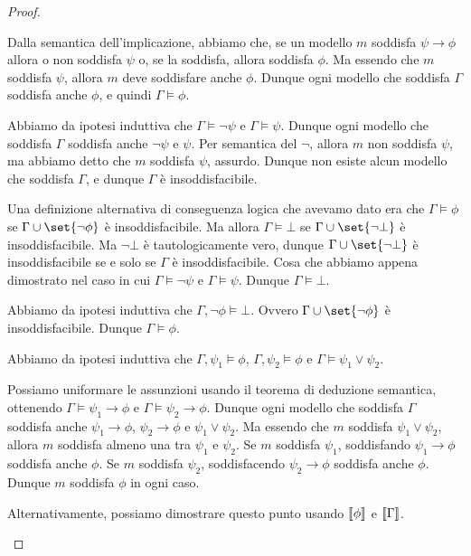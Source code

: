 \begin{proof}
\begin{description}
      Dalla semantica dell'implicazione, abbiamo che, se un modello \(m\) soddisfa \(\psi\to\phi\) allora o non soddisfa \(\psi\) o, se la soddisfa, allora soddisfa \(\phi\). Ma essendo che \(m\) soddisfa \(\psi\), allora \(m\) deve soddisfare anche \(\phi\). Dunque ogni modello che soddisfa \(\Gamma\) soddisfa anche \(\phi\), e quindi \(\Gamma\models\phi\).
    \item[\(\neg E\).] Abbiamo da ipotesi induttiva che \(\Gamma\models\neg\psi\) e \(\Gamma\models\psi\). Dunque ogni modello che soddisfa \(\Gamma\) soddisfa anche \(\neg\psi\) e \(\psi\). Per semantica del \(\neg\), allora \(m\) non soddisfa \(\psi\), ma abbiamo detto che \(m\) soddisfa \(\psi\), assurdo. Dunque non esiste alcun modello che soddisfa \(\Gamma\), e dunque \(\Gamma\) è insoddisfacibile.

    Una definizione alternativa di conseguenza logica che avevamo dato era che \(\Gamma\models\phi\) se \(\Gamma\cup\set{\neg\phi}\) è insoddisfacibile. Ma allora \(\Gamma\models\bot\) se \(\Gamma\cup\set{\neg \bot}\) è insoddisfacibile. Ma \(\neg\bot\) è tautologicamente vero, dunque \(\Gamma\cup\set{\neg \bot}\) è insoddisfacibile se e solo se \(\Gamma\) è insoddisfacibile. Cosa che abbiamo appena dimostrato nel caso in cui \(\Gamma\models\neg\psi\) e \(\Gamma\models\psi\). Dunque \(\Gamma\models\bot\).

    \item[\(\RAA\).] Abbiamo da ipotesi induttiva che \(\Gamma,\neg\phi\models\bot\). Ovvero \(\Gamma\cup\set{\neg\phi}\) è insoddisfacibile. Dunque \(\Gamma\models\phi\).
    \item[\(\lor E\).] Abbiamo da ipotesi induttiva che \(\Gamma,\psi_1\models\phi\), \(\Gamma,\psi_2\models\phi\) e \(\Gamma\models\psi_1\lor\psi_2\).
    
    Possiamo uniformare le assunzioni usando il teorema di deduzione semantica, ottenendo \(\Gamma\models\psi_1\to\phi\) e \(\Gamma\models\psi_2\to\phi\). Dunque ogni modello che soddisfa \(\Gamma\) soddisfa anche \(\psi_1\to\phi\), \(\psi_2\to\phi\) e \(\psi_1\lor\psi_2\). Ma essendo che \(m\) soddisfa \(\psi_1\lor\psi_2\), allora \(m\) soddisfa almeno una tra \(\psi_1\) e \(\psi_2\). Se \(m\) soddisfa \(\psi_1\), soddisfando \(\psi_1\to\phi\) soddisfa anche \(\phi\). Se \(m\) soddisfa \(\psi_2\), soddisfacendo \(\psi_2\to\phi\) soddisfa anche \(\phi\). Dunque \(m\) soddisfa \(\phi\) in ogni caso.
    
    Alternativamente, possiamo dimostrare questo punto usando \(\den{\phi}\) e \(\den{\Gamma}\).


\end{description}
\end{proof}
